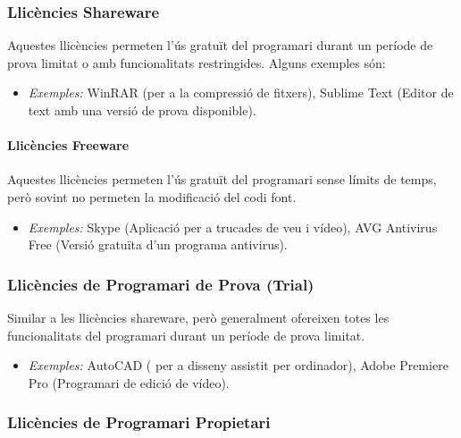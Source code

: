 \documentclass[
  12 pt,
  a4paper,
]{article}
\providecommand{\tightlist}{%
  \setlength{\itemsep}{0pt}\setlength{\parskip}{0pt}}
\begin{document}
\subsubsection{Llicències Shareware}\label{llicuxe8ncies-shareware}

Aquestes llicències permeten l'ús gratuït del programari durant un
període de prova limitat o amb funcionalitats restringides. Alguns
exemples són:

\begin{itemize}
\tightlist
\item
  \emph{Exemples:} WinRAR (per a la compressió de fitxers), Sublime Text
  (Editor de text amb una versió de prova disponible).
\end{itemize}

\paragraph{\texorpdfstring{\textbf{Llicències
Freeware}}{Llicències Freeware}}\label{llicuxe8ncies-freeware}

Aquestes llicències permeten l'ús gratuït del programari sense límits de
temps, però sovint no permeten la modificació del codi font.

\begin{itemize}
\tightlist
\item
  \emph{Exemples:} Skype (Aplicació per a trucades de veu i vídeo), AVG
  Antivirus Free (Versió gratuïta d'un programa antivirus).
\end{itemize}

\subsubsection{Llicències de Programari de Prova
(Trial)}\label{llicuxe8ncies-de-programari-de-prova-trial}

Similar a les llicències shareware, però generalment ofereixen totes les
funcionalitats del programari durant un període de prova limitat.

\begin{itemize}
\tightlist
\item
  \emph{Exemples:} AutoCAD ( per a disseny assistit per ordinador),
  Adobe Premiere Pro (Programari de edició de vídeo).
\end{itemize}

\subsubsection{Llicències de Programari
Propietari}\label{llicuxe8ncies-de-programari-propietari}
\end{document}

